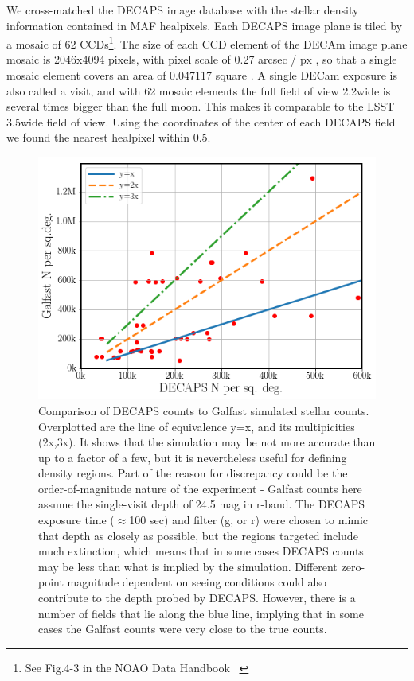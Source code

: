 \documentclass[DM,lsstdraft,toc,usenatbib]{lsstdoc}
\begin{document}
We cross-matched the DECAPS image database with the  stellar density information contained in MAF healpixels. Each DECAPS image plane is tiled by a mosaic of 62 CCDs\footnote{See Fig.4-3 in the NOAO Data Handbook ~\citep{shaw2015}}. The size of each CCD element of the DECAm image plane mosaic is 2046x4094 pixels, with pixel scale of 0.27 arcsec / px , so that a single mosaic element covers an area of 0.047117 square \degree. A single DECam exposure is also called a visit, and with 62 mosaic elements the full field of view  2.2\degree wide is several times bigger than the full moon. This makes it comparable to the LSST 3.5\degree wide field of view.  Using the coordinates of the center of each DECAPS field  we found the nearest healpixel within 0.5\degree . 


\begin{figure}
\centering
\includegraphics[width=0.75\columnwidth]{figs/MAF_DECAPS_comparison.png}
\caption{Comparison of DECAPS counts to Galfast simulated stellar counts.  Overplotted are the line of equivalence y=x, and its multipicities (2x,3x). It shows that the simulation may be not more accurate than up to a factor of a few, but it is nevertheless useful for defining density regions. Part of the reason for discrepancy could be the order-of-magnitude nature of the experiment - Galfast counts here assume the single-visit depth of 24.5 mag in r-band. The DECAPS exposure time ($\approx$100 sec) and filter (g, or r) were chosen to mimic that depth as closely as possible, but the regions targeted include much extinction, which means that in some cases DECAPS counts may be less than what is  implied by the simulation. Different zero-point magnitude dependent on seeing conditions could also contribute to the depth probed by DECAPS.  However, there is a number of fields that lie along the blue line, implying that in some cases the Galfast counts were very close to the true counts.}
\label{fig:maf_decaps_compare}
\end{figure} 
\end{document}
